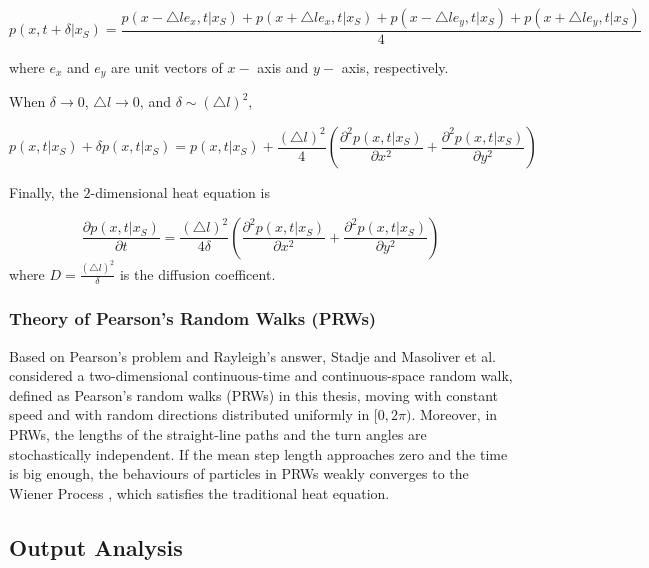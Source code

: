 \begin{equation}
  p(x, t + \delta | x_{S}) = \frac{p(x - \triangle l e_{x}, t| x_{S}) +
    p(x + \triangle l e_{x}, t| x_{S}) + p(x - \triangle l e_{y}, t|
    x_{S}) + p(x + \triangle l e_{y}, t| x_{S})}{4}
\end{equation}

where $e_x$ and $e_y$ are unit vectors of $x-$ axis and $y-$ axis, respectively. 


When $\delta \rightarrow 0$, $\triangle l \rightarrow 0$, and $\delta \sim (\triangle l)^2$, 

\begin{equation}
  p(x, t | x_{S}) + \delta p(x, t | x_{S}) = p(x, t | x_{S}) +
  \frac{(\triangle l)^2}{4} (\frac{\partial ^2 p(x, t|
    x_{S})}{\partial x^2} + \frac{\partial^2 p (x, t| x_{S})}{\partial
    y^2})
\end{equation}

Finally, the $2$-dimensional heat equation is

\begin{equation}
  \frac{\partial p(x, t| x_{S})}{\partial t} = \frac{(\triangle
    l)^2}{4 \delta} (\frac{\partial ^2 p(x, t| x_{S})}{\partial x^2} +
  \frac{\partial^2 p (x, t| x_{S})}{\partial y^2})
\end{equation}
where $D = \frac{(\triangle l)^2}{\delta}$ is the diffusion coefficent.


\subsubsection{Theory of Pearson's Random Walks (PRWs)}

Based on Pearson's problem and Rayleigh's answer, Stadje
\cite{stadje1987exact} and Masoliver et al. \cite{masoliver1993some}
considered a two-dimensional continuous-time and continuous-space
random walk, defined as Pearson's random walks (PRWs) in this thesis,
moving with constant speed and with random directions distributed
uniformly in $[0, 2\pi)$. Moreover, in PRWs, the lengths of the
  straight-line paths and the turn angles are stochastically
  independent. If the mean step length approaches zero and the time is
  big enough, the behaviours of particles in PRWs weakly converges to
  the Wiener Process \cite{stadje1987exact}, which satisfies the
  traditional heat equation.
  
  
\subsection{Output Analysis}

